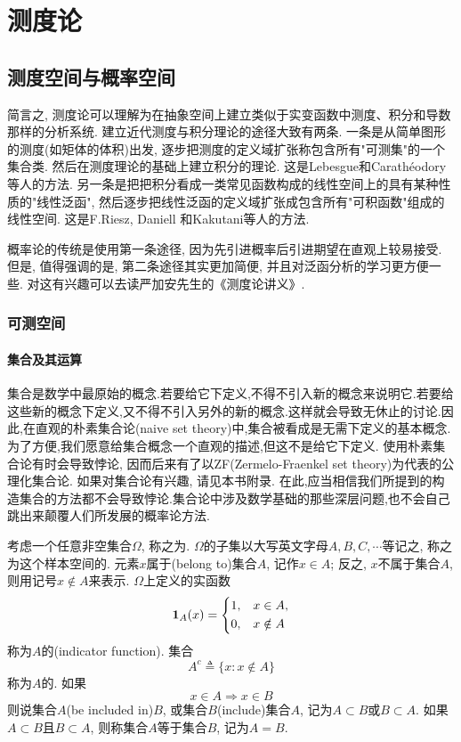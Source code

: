 \part{测度论}


\chapter{测度空间与概率空间}
简言之, 测度论可以理解为在抽象空间上建立类似于实变函数中测度、积分和导数那样的分析系统. 建立近代测度与积分理论的途径大致有两条. 一条是从简单图形的测度(如矩体的体积)出发, 逐步把测度的定义域扩张称包含所有"可测集"的一个集合类. 然后在测度理论的基础上建立积分的理论. 这是Lebesgue和Carathéodory等人的方法. 另一条是把把积分看成一类常见函数构成的线性空间上的具有某种性质的"线性泛函", 然后逐步把线性泛函的定义域扩张成包含所有"可积函数"组成的线性空间. 这是F.Riesz, Daniell 和Kakutani等人的方法. 

概率论的传统是使用第一条途径, 因为先引进概率后引进期望在直观上较易接受. 但是, 值得强调的是, 第二条途径其实更加简便, 并且对泛函分析的学习更方便一些. 对这有兴趣可以去读严加安先生的《测度论讲义》.


\section{可测空间}
\subsection{集合及其运算}
集合是数学中最原始的概念.若要给它下定义,不得不引入新的概念来说明它.若要给这些新的概念下定义,又不得不引入另外的新的概念.这样就会导致无休止的讨论.因此,在直观的朴素集合论(naive set theory)中,集合被看成是无需下定义的基本概念.为了方便,我们愿意给集合概念一个直观的描述,但这不是给它下定义. 使用朴素集合论有时会导致悖论, 因而后来有了以ZF(Zermelo-Fraenkel set theory)为代表的公理化集合论. 如果对集合论有兴趣, 请见本书附录. 在此,应当相信我们所提到的构造集合的方法都不会导致悖论.集合论中涉及数学基础的那些深层问题,也不会自己跳出来颠覆人们所发展的概率论方法. 

考虑一个任意非空集合$\Omega$, 称之为. $\Omega$的子集以大写英文字母$A,B,C,\cdots$等记之, 称之为这个样本空间的. 元素$x$属于(belong to)集合$A$, 记作$x\in A$; 反之, $x$不属于集合$A$, 则用记号$x\notin A$来表示. $\Omega$上定义的实函数
\begin{equation}
\bm{1}_{A}(x) = \begin{dcases}
1, &x\in A,\\
0, &x\notin A
\end{dcases}
\end{equation}
称为$A$的(indicator function). 集合\begin{equation}
A^c \triangleq \{ x:x\notin A \}
\end{equation}
称为$A$的. 如果
\begin{equation}
x\in A\Rightarrow x\in B
\end{equation}
则说集合$A$(be included in)$B$, 或集合$B$(include)集合$A$, 记为$A\subset B$或$B\subset A$. 如果$A\subset B$且$B\subset A$, 则称集合$A$等于集合$B$, 记为$A = B$.

